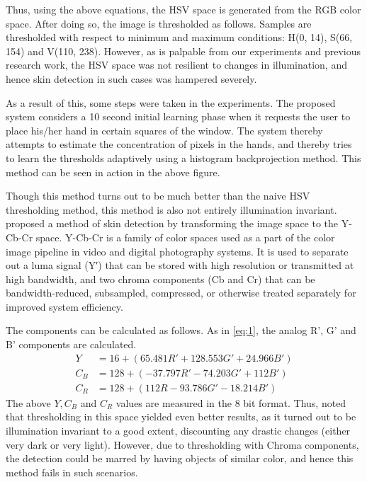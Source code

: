 \documentclass[letterpaper, 10 pt, twoside, conference]{ieeeconf}
\begin{document}
Thus, using the above equations, the HSV space is generated from the RGB color space.
After doing so, the image is thresholded as follows. Samples are thresholded with respect
to minimum and maximum conditions: H(0, 14), S(66, 154) and V(110, 238).
However, as is palpable from our experiments and previous research work, the HSV space
was not resilient to changes in illumination, and hence skin detection in such cases
was hampered severely.

As a result of this, some steps were taken in the experiments. The proposed system considers
a 10 second initial learning phase when it requests the user to place his/her hand in certain
squares of the window. The system thereby attempts to estimate the concentration of pixels in the
hands, and thereby tries to learn the thresholds adaptively using a histogram backprojection method.
This method can be seen in action in the above figure. 

Though this method turns out to be much better than the naive HSV thresholding method, this method is
also not entirely illumination invariant. \cite{Chai1999} proposed a method of skin detection by transforming
the image space to the Y-Cb-Cr space. Y-Cb-Cr is a family of color spaces used as a part of the color image
pipeline in video and digital photography systems. It is used to separate out a luma signal (Y′) that can be 
stored with high resolution or transmitted at high bandwidth, and two chroma components (Cb and Cr) 
that can be bandwidth-reduced, subsampled, compressed, or otherwise treated separately for improved system efficiency.

The components can be calculated as follows. As in \ref{eq:1}, the analog R', G' and B' components are calculated.
\[
  \begin{split}
    Y &= 16 + (65.481R' + 128.553G' + 24.966B')
    \\
    C_B &= 128 + (-37.797R' - 74.203G' + 112B')
    \\
    C_R &= 128 + (112R - 93.786G' - 18.214B')
  \end{split}
\]
The above $Y,C_B$ and $C_R$ values are measured in the 8 bit format. Thus, \cite{Chai1999} noted that thresholding
in this space yielded even better results, as it turned out to be illumination invariant to a good extent,
discounting any drastic changes (either very dark or very light). However, due to thresholding with Chroma
components, the detection could be marred by having objects of similar color, and hence this method fails
in such scenarios.
\end{document}
